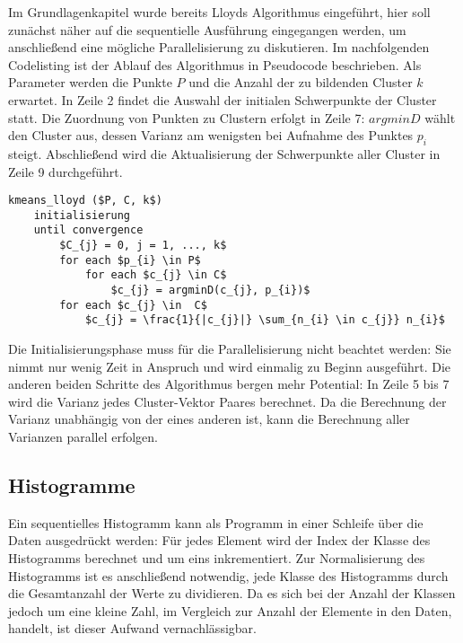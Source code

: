 Im Grundlagenkapitel wurde bereits Lloyds Algorithmus eingeführt, hier soll zunächst näher auf die sequentielle Ausführung eingegangen werden, um anschließend eine mögliche Parallelisierung zu diskutieren. Im nachfolgenden Codelisting ist der Ablauf des Algorithmus in Pseudocode beschrieben. Als Parameter werden die Punkte $P$ und die Anzahl der zu bildenden Cluster $k$ erwartet. In Zeile 2 findet die Auswahl der initialen Schwerpunkte der Cluster statt. Die Zuordnung von Punkten zu Clustern erfolgt in Zeile 7: $argminD$ wählt den Cluster aus, dessen Varianz am wenigsten bei Aufnahme des Punktes $p_{i}$ steigt. Abschließend wird die Aktualisierung der Schwerpunkte aller Cluster in Zeile 9 durchgeführt.

\lstset{language=C}
\begin{lstlisting}[mathescape=true]
kmeans_lloyd ($P, C, k$)
	initialisierung
	until convergence
		$C_{j} = 0, j = 1, ..., k$
		for each $p_{i} \in P$
			for each $c_{j} \in C$
				$c_{j} = argminD(c_{j}, p_{i})$		
		for each $c_{j} \in  C$
			$c_{j} = \frac{1}{|c_{j}|} \sum_{n_{i} \in c_{j}} n_{i}$
\end{lstlisting}

Die Initialisierungsphase muss für die Parallelisierung nicht beachtet werden: Sie nimmt nur wenig Zeit in Anspruch und wird einmalig zu Beginn ausgeführt. Die anderen beiden Schritte des Algorithmus bergen mehr Potential: In Zeile 5 bis 7 wird die Varianz jedes Cluster-Vektor Paares berechnet. Da die Berechnung der Varianz unabhängig von der eines anderen ist, kann die Berechnung aller Varianzen parallel erfolgen. 


\subsection{Histogramme}

Ein sequentielles Histogramm kann als Programm in einer Schleife über die Daten ausgedrückt werden: Für jedes Element wird der Index der Klasse des Histogramms berechnet und um eins inkrementiert. Zur Normalisierung des Histogramms ist es anschließend notwendig, jede Klasse des Histogramms durch die Gesamtanzahl der Werte zu dividieren. Da es sich bei der Anzahl der Klassen jedoch um eine kleine Zahl, im Vergleich zur Anzahl der Elemente in den Daten, handelt, ist dieser Aufwand vernachlässigbar.


